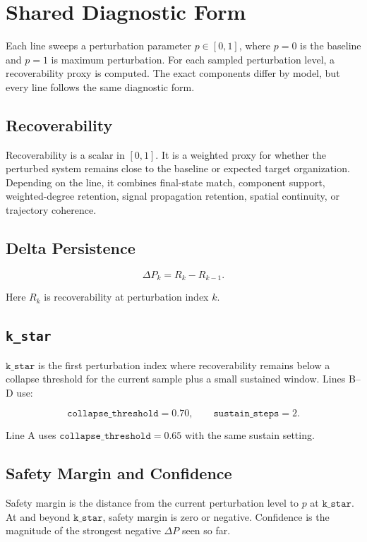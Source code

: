 \documentclass[11pt]{article}
\begin{document}
\section{Shared Diagnostic Form}

Each line sweeps a perturbation parameter \(p \in [0,1]\), where \(p=0\) is the baseline and \(p=1\) is maximum perturbation. For each sampled perturbation level, a recoverability proxy is computed. The exact components differ by model, but every line follows the same diagnostic form.

\subsection{Recoverability}

Recoverability is a scalar in \([0,1]\). It is a weighted proxy for whether the perturbed system remains close to the baseline or expected target organization. Depending on the line, it combines final-state match, component support, weighted-degree retention, signal propagation retention, spatial continuity, or trajectory coherence.

\subsection{Delta Persistence}

\[
\Delta P_k = R_k - R_{k-1}.
\]

Here \(R_k\) is recoverability at perturbation index \(k\).

\subsection{\texttt{k\_star}}

\(\texttt{k\_star}\) is the first perturbation index where recoverability remains below a collapse threshold for the current sample plus a small sustained window. Lines B--D use:

\[
\texttt{collapse\_threshold}=0.70,\qquad \texttt{sustain\_steps}=2.
\]

Line A uses \(\texttt{collapse\_threshold}=0.65\) with the same sustain setting.

\subsection{Safety Margin and Confidence}

Safety margin is the distance from the current perturbation level to \(p\) at \(\texttt{k\_star}\). At and beyond \(\texttt{k\_star}\), safety margin is zero or negative. Confidence is the magnitude of the strongest negative \(\Delta P\) seen so far.
\end{document}
